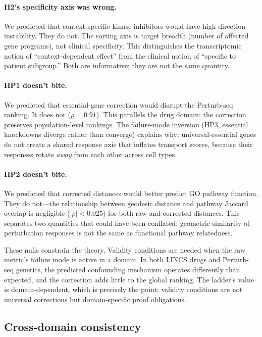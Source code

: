 \documentclass{article}
\begin{document}
\paragraph{H2's specificity axis was wrong.}
We predicted that context-specific kinase inhibitors would have high direction
instability. They do not. The sorting axis is target breadth (number of
affected gene programs), not clinical specificity. This distinguishes the
transcriptomic notion of ``context-dependent effect'' from the clinical notion
of ``specific to patient subgroup.'' Both are informative; they are not the
same quantity.

\paragraph{HP1 doesn't bite.}
We predicted that essential-gene correction would disrupt the Perturb-seq
ranking. It does not ($\rho = 0.91$). This parallels the drug domain: the
correction preserves population-level rankings. The failure-mode inversion
(HP3, essential knockdowns diverge rather than converge) explains why:
universal-essential genes do not create a shared response axis that inflates
transport scores, because their responses rotate \emph{away} from each other
across cell types.

\paragraph{HP2 doesn't bite.}
We predicted that corrected distances would better predict GO pathway
function. They do not---the relationship between geodesic distance and
pathway Jaccard overlap is negligible ($|\rho| < 0.025$) for both raw and
corrected distances. This separates two quantities that could have been
conflated: geometric similarity of perturbation responses is not the same as
functional pathway relatedness.

These nulls constrain the theory. Validity conditions are needed when the raw
metric's failure mode is active in a domain. In both LINCS drugs and
Perturb-seq genetics, the predicted confounding mechanism operates differently
than expected, and the correction adds little to the global ranking. The
ladder's value is domain-dependent, which is precisely the point: validity
conditions are not universal corrections but domain-specific proof obligations.

\subsection{Cross-domain consistency}
\end{document}
